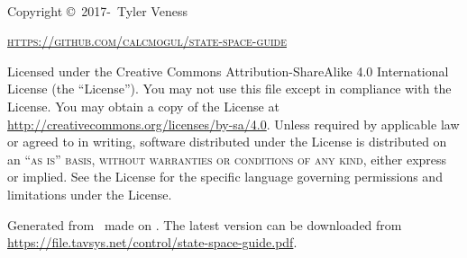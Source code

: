 ~\vfill
\thispagestyle{empty}

Copyright \copyright\ 2017-\unskip~Tyler Veness

\textsc{\url{https://github.com/calcmogul/state-space-guide}}

Licensed under the Creative Commons Attribution-ShareAlike 4.0 International
License (the ``License''). You may not use this file except in compliance with
the License. You may obtain a copy of the License at
\url{http://creativecommons.org/licenses/by-sa/4.0}. Unless required by
applicable law or agreed to in writing, software distributed under the License
is distributed on an \textsc{``as is'' basis, without warranties or conditions
of any kind}, either express or implied. See the License for the specific
language governing permissions and limitations under the License.

Generated from \unskip~made on
\unskip. The latest version can be downloaded from
\url{https://file.tavsys.net/control/state-space-guide.pdf}.
